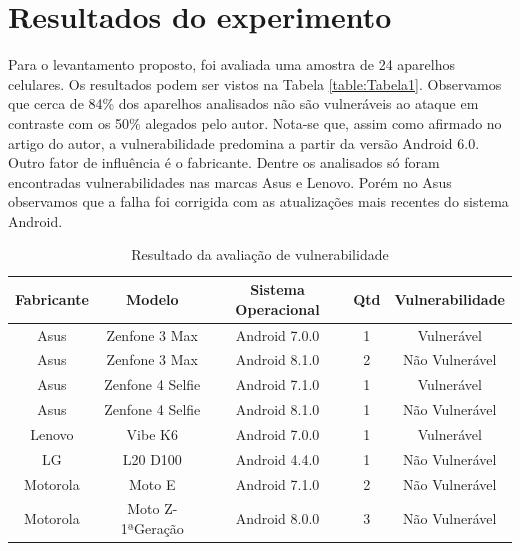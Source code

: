 \documentclass[12pt]{article}
\begin{document}
\section{Resultados do experimento}
Para o levantamento proposto, foi avaliada uma amostra de 24 aparelhos celulares. Os resultados podem ser vistos na Tabela \ref{table:Tabela1}. Observamos que cerca de 84\% dos aparelhos analisados não são vulneráveis ao ataque em contraste com os 50\% alegados pelo autor. Nota-se que, assim como afirmado no artigo do autor, a vulnerabilidade predomina a partir da versão Android 6.0. Outro fator de influência é o fabricante. Dentre os analisados só foram encontradas vulnerabilidades nas marcas Asus e Lenovo. Porém no Asus observamos que a falha foi corrigida com as atualizações mais recentes do sistema Android. 

\begin{table}[H]
\caption{Resultado da avaliação de vulnerabilidade}
\begin{tabular}{|c|c|c|c|c|}
\hline
\textbf{Fabricante} & \textbf{Modelo}   & \textbf{Sistema Operacional} & \multicolumn{1}{l|}{\textbf{Qtd}} & \textbf{Vulnerabilidade} \\ \hline
Asus                & Zenfone 3 Max     & Android 7.0.0                & 1                                 & Vulnerável               \\ \hline
Asus                & Zenfone 3 Max     & Android 8.1.0                & 2                                 & Não Vulnerável           \\ \hline
Asus                & Zenfone 4 Selfie  & Android 7.1.0                & 1                                 & Vulnerável               \\ \hline
Asus                & Zenfone 4 Selfie  & Android 8.1.0                & 1                                 & Não Vulnerável           \\ \hline
Lenovo              & Vibe K6           & Android 7.0.0                & 1                                 & Vulnerável               \\ \hline
LG                  & L20 D100          & Android 4.4.0                & 1                                 & Não Vulnerável           \\ \hline
Motorola            & Moto E            & Android 7.1.0                & 2                                 & Não Vulnerável           \\ \hline
Motorola            & Moto Z- 1ªGeração & Android 8.0.0                & 3                                 & Não Vulnerável           \\ \hline

\end{tabular}
\end{table}
\end{document}
